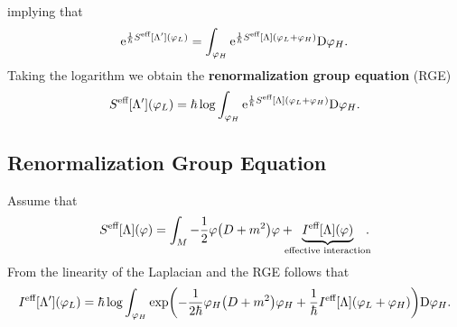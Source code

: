 implying that
\begin{equation*}
  \mathrm{e}^{\frac{1}{\hbar} S^\text{eff}[\Lambda'] (\varphi_L)}
  = \int_{\varphi_H} \mathrm{e}^{\frac{1}{\hbar} S^\text{eff} [\Lambda] (\varphi_L + \varphi_H)} \mathrm{D} \varphi_H.
\end{equation*}
Taking the logarithm we obtain the \textbf{renormalization group equation} (RGE)
\begin{equation*}
  S^\text{eff}[\Lambda'] (\varphi_L)
  = \hbar \log \int_{\varphi_H} \mathrm{e}^{\frac{1}{\hbar} S^\text{eff}[\Lambda] (\varphi_L + \varphi_H)} 
  \mathrm{D} \varphi_H.
\end{equation*}

\subsection{Renormalization Group Equation}

Assume that
\begin{equation*}
  S^\text{eff}[\Lambda] (\varphi) = \int_M - \frac{1}{2} \varphi \bigl(D + m^2\bigr) \varphi
  + \hspace{-3mm}
  \underbrace{I^\text{eff}[\Lambda] (\varphi)}_{\text{effective interaction}} \hspace{-2mm}.
\end{equation*}
From the linearity of the Laplacian and the RGE follows that
\begin{equation*}
  I^\text{eff}[\Lambda'](\varphi_L)
  = \hbar \log \int_{\varphi_H} \exp
    \biggl( -\frac{1}{2 \hbar} \varphi_H \bigl(D + m^2\bigr) \varphi_H
    + \frac{1}{\hbar} I^\text{eff}[\Lambda] (\varphi_L + \varphi_H) \biggr) \mathrm{D} \varphi_H.
\end{equation*}

